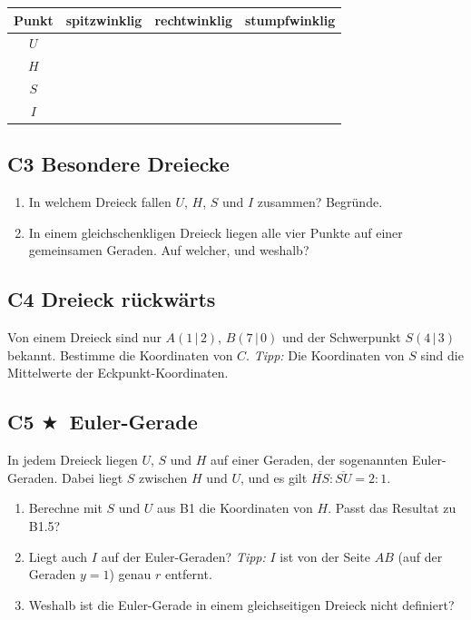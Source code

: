 \documentclass[11pt,a4paper]{article}
\renewcommand{\arraystretch}{1.25}
\newcommand{\stern}{$\bigstar$\ }
\begin{document}
\vspace{2pt}
\renewcommand{\arraystretch}{2.1}
\begin{tabularx}{\linewidth}{|>{\bfseries}c|L|L|L|}
\hline
Punkt & \textbf{spitzwinklig} & \textbf{rechtwinklig} & \textbf{stumpfwinklig} \\ \hline
$U$ & & & \\ \hline
$H$ & & & \\ \hline
$S$ & & & \\ \hline
$I$ & & & \\ \hline
\end{tabularx}
\renewcommand{\arraystretch}{1.25}

\subsection{C3 \quad Besondere Dreiecke}
\begin{enumerate}
\item In welchem Dreieck fallen $U$, $H$, $S$ und $I$ zusammen? Begr\"unde.
\item In einem gleichschenkligen Dreieck liegen alle vier Punkte auf einer gemeinsamen Geraden. Auf welcher, und weshalb?
\end{enumerate}

\subsection{C4 \quad Dreieck r\"uckw\"arts}
Von einem Dreieck sind nur $A(1\,|\,2)$, $B(7\,|\,0)$ und der Schwerpunkt $S(4\,|\,3)$ bekannt. Bestimme die Koordinaten von $C$. \emph{Tipp:} Die Koordinaten von $S$ sind die Mittelwerte der Eckpunkt-Koordinaten.

\subsection{C5 \quad \stern Euler-Gerade}
In jedem Dreieck liegen $U$, $S$ und $H$ auf einer Geraden, der sogenannten Euler-Geraden. Dabei liegt $S$ zwischen $H$ und $U$, und es gilt $\overline{HS} : \overline{SU} = 2:1$.
\begin{enumerate}
\item Berechne mit $S$ und $U$ aus B1 die Koordinaten von $H$. Passt das Resultat zu B1.5?
\item Liegt auch $I$ auf der Euler-Geraden? \emph{Tipp:} $I$ ist von der Seite $AB$ (auf der Geraden $y = 1$) genau $r$ entfernt.
\item Weshalb ist die Euler-Gerade in einem gleichseitigen Dreieck nicht definiert?
\end{enumerate}
\end{document}

